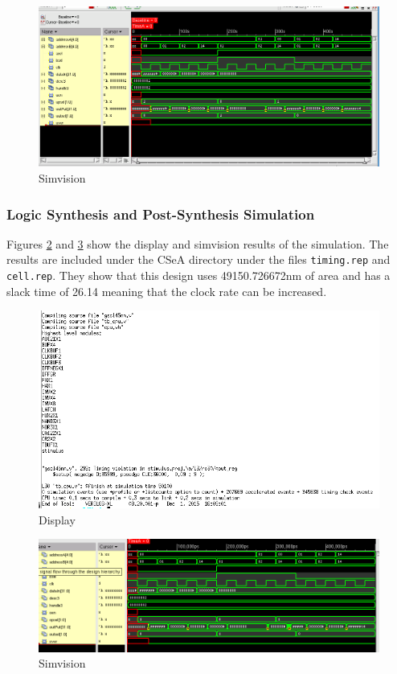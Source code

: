 \documentclass[12pt]{article}
\begin{document}
\begin{figure}[H]
\centering
\includegraphics[width=\linewidth]{../CSeA/CSeA-test}
\caption{Simvision}
\label{fig:CSeA-test}
\end{figure}

\subsubsection{Logic Synthesis and Post-Synthesis Simulation}
Figures \ref{fig:synth-text-CSeA} and \ref{fig:synth-test-CSeA} show the display and simvision results of the simulation. The results are included under the CSeA directory under the files \texttt{timing.rep} and \texttt{cell.rep}. They show that this design uses 49150.726672nm of area and has a slack time of 26.14 meaning that the clock rate can be increased.
\begin{figure}[H]
\centering
\includegraphics[width=.7\linewidth]{../CSeA/synth-text}
\caption{Display}
\label{fig:synth-text-CSeA}
\end{figure}
\begin{figure}[H]
\centering
\includegraphics[width=\linewidth]{../CSeA/synth-test}
\caption{Simvision}
\label{fig:synth-test-CSeA}
\end{figure}
\end{document}

